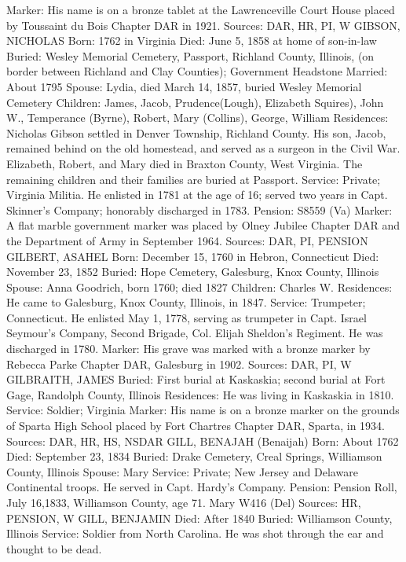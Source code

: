 Marker: His name is on a bronze tablet at the Lawrenceville Court House placed by Toussaint du Bois Chapter DAR in 1921. 
Sources: DAR, HR, PI, W 
GIBSON, NICHOLAS 
Born: 1762 in Virginia 
Died: June 5, 1858 at home of son-in-law 
Buried: Wesley Memorial Cemetery, Passport, Richland County, Illinois, (on border between Richland and Clay Counties); Government Headstone 
Married: About 1795 
Spouse: Lydia, died March 14, 1857, buried Wesley Memorial Cemetery 
Children: James, Jacob, Prudence(Lough), Elizabeth Squires), John W., Temper­ance (Byrne), Robert, Mary (Collins), George, William 
Residences: Nicholas Gibson settled in Denver Township, Richland County. His son, Jacob, remained behind on the old homestead, and served as a surgeon in the Civil War. Elizabeth, Robert, and Mary died in Braxton County, West Virginia. The remaining children and their families are buried at Passport. 
Service: Private; Virginia Militia. He enlisted in 1781 at the age of 16; served two years in Capt. Skinner's Company; honorably discharged in 1783. 
Pension: S8559 (Va) 
Marker: A flat marble government marker was placed by Olney Jubilee Chapter DAR and the Department of Army in September 1964. 
Sources: DAR, PI, PENSION 
GILBERT, ASAHEL 
Born: December 15, 1760 in Hebron, Connecticut 
Died: November 23, 1852 
Buried: Hope Cemetery, Galesburg, Knox County, Illinois 
Spouse: Anna Goodrich, born 1760; died 1827 
Children: Charles W. 
Residences: He came to Galesburg, Knox County, Illinois, in 1847. 
Service: Trumpeter; Connecticut. He enlisted May 1, 1778, serving as trumpeter in Capt. Israel Seymour's Company, Second Brigade, Col. Elijah Sheldon's Regiment. He was discharged in 1780. 
Marker: His grave was marked with a bronze marker by Rebecca Parke Chapter DAR, Galesburg in 1902. 
Sources: DAR, PI, W 
GILBRAITH, JAMES 
Buried: First burial at Kaskaskia; second burial at Fort Gage, Randolph County, Illinois 
Residences: He was living in Kaskaskia in 1810. 
Service: Soldier; Virginia 
Marker: His name is on a bronze marker on the grounds of Sparta High School placed by Fort Chartres Chapter DAR, Sparta, in 1934. 
Sources: DAR, HR, HS, NSDAR 
GILL, BENAJAH (Benaijah) 
Born: About 1762 
Died: September 23, 1834 
Buried: Drake Cemetery, Creal Springs, Williamson County, Illinois 
Spouse: Mary 
Service: Private; New Jersey and Delaware Continental troops. He served in Capt. Hardy's Company. 
Pension: Pension Roll, July 16,1833, Williamson County, age 71. Mary W416 (Del) Sources: HR, PENSION, W 
GILL, BENJAMIN 
Died: After 1840 
Buried: Williamson County, Illinois 
Service: Soldier from North Carolina. He was shot through the ear and thought to be dead. 

